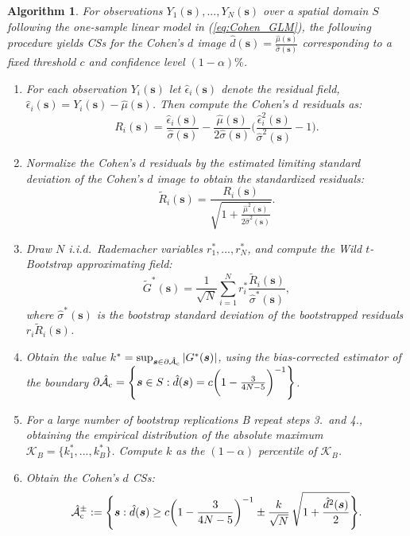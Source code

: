 \newtheorem{algorithm}{Algorithm}
\begin{algorithm}
\label{alg:one}
For observations $Y_{1}(\bm{s}), ..., Y_{N}(\bm{s})$ over a spatial domain $S$ following the one-sample linear model in (\ref{eq:Cohen_GLM}), the following procedure yields CSs for the Cohen's $d$ image $\hat{d}(\bm{s}) = \frac{\hat{\mu}(\bm{s})}{\hat{\sigma}(\bm{s})}$ corresponding to a fixed threshold $c$ and confidence level $(1 - \alpha)\%$.
\begin{enumerate}
\item For each observation $Y_i(\bm{s})$ let $\hat{\epsilon}_{i}(\bm{s})$ denote the residual field, $\hat{\epsilon}_{i}(\bm{s}) = Y_{i}(\bm{s}) - \hat{\mu}(\bm{s})$. Then compute the Cohen's $d$ residuals as: 
$$R_{i}(\bm{s}) = \frac{\hat{\epsilon}_{i}(\bm{s})}{\hat{\sigma}(\bm{s})} - \frac{\hat{\mu}(\bm{s})}{2\hat{\sigma}(\bm{s})}\Bigg( \frac{\hat{\epsilon}_{i}^{2}(\bm{s})}{\hat{\sigma}^{2}(\bm{s})} - 1 \Bigg).$$ 
\item Normalize the Cohen's $d$ residuals by the estimated limiting standard deviation of the Cohen's $d$ image to obtain the standardized residuals:
$$\tilde{R}_{i}(\bm{s}) = \frac{R_{i}(\bm{s})}{\sqrt{1 + \frac{\hat{\mu}^{2}(\bm{s})}{2\hat{\sigma}^{2}(\bm{s})}}}.$$ 
\item Draw $N$ i.i.d.\ Rademacher variables $r_{1}^{*}, ..., r_{N}^{*}$, and compute the Wild $t$-Bootstrap approximating field:
$$\tilde{G}^{*}(\bm{s}) = \frac{1}{\sqrt{N}}\sum_{i=1}^{N} r^*_i\frac{\tilde{R}_{i}(\bm{s})}{\hat{\sigma}^*(\bm{s})},$$
where $\hat{\sigma}^{*}(\bm{s})$ is the bootstrap standard deviation of the bootstrapped residuals $r_{i}\tilde{R}_{i}(\bm{s})$. 
\item Obtain the value $k^{*} = \sup_{\bm{s}\in\operatorname{\partial\hat{\mathcal{A}}_{c}}}|G^{*}(\bm{s})|$, using the bias-corrected estimator of the boundary $\operatorname{\partial\hat{\mathcal{A}}_{c}} = \Bigg\{\bm{s} \in S : \hat{d}(\bm{s}) = c\bigg(1 - \frac{3}{4N - 5}\bigg)^{-1} \Bigg\}$.
\item For a large number of bootstrap replications B repeat steps 3.\ and 4., obtaining the empirical distribution of the absolute maximum $\mathcal{K}_{B} = \{k_{1}^{*}, ..., k_{B}^{*}\}$. Compute $k$ as the $(1 - \alpha)$ percentile of $\mathcal{K}_{B}$.
\item Obtain the Cohen's $d$ CSs:
$$\operatorname{\hat{\mathcal{A}}_{c}^\pm} := \Bigg\{\bm{s} : \hat{d}(\bm{s}) \geq c\bigg(1 - \frac{3}{4N - 5}\bigg)^{-1} \pm \frac{k}{{\sqrt{N}}}\, \sqrt{1 + \frac{\hat{d}^{2}({\bm{s}})}{2}}\Bigg\}.$$
\end{enumerate}
\end{algorithm}


